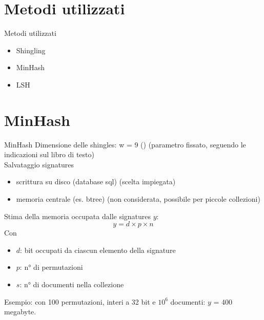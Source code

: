 \documentclass[10pt]{beamer}
\begin{document}
\section{Metodi utilizzati}
\begin{frame}{Metodi utilizzati}
\begin{itemize}
	\item Shingling
	\item MinHash
	\item LSH
\end{itemize}
\end{frame}


\section{MinHash}
\begin{frame}{MinHash}
Dimensione delle shingles: w = 9 (\cite{leskovec2014mining}) (parametro fissato, seguendo le indicazioni sul libro di testo)\\
Salvataggio signatures
\begin{itemize}
	\item scrittura su disco (database sql) (scelta impiegata)
	\item memoria centrale (es. btree) (non considerata, possibile per piccole collezioni)
\end{itemize}
Stima della memoria occupata dalle signatures $y$:
\[ y =  d \times p \times n \]
Con
\begin{itemize}
	\item $d$: bit occupati da ciascun elemento della signature
	\item $p$: n° di permutazioni
	\item $s$: n° di documenti nella collezione
\end{itemize}
Esempio: con 100 permutazioni, interi a 32 bit e $10^6$ documenti: $y$ = 400 megabyte.
\end{frame}
\end{document}
